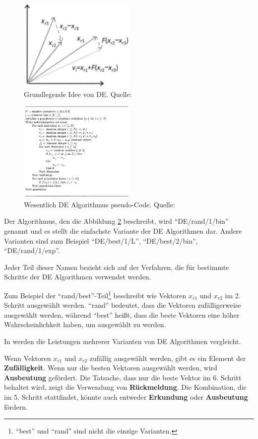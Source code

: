 \documentclass[twoside,twocolumn]{article}
\begin{document}
\begin{figure}
\caption{Grundlegende Idee von DE. Quelle: \cite{wiley_evolutionary}}
\label{fig:de_beispiel}
\centering
\includegraphics[width=0.5\textwidth]{images/de_beispiel.png}
\end{figure}

\begin{figure}
\caption{Wesentlich DE Algorithmus pseudo-Code. Quelle: \cite{wiley_evolutionary}}
\label{fig:de_pseudo}
\centering
\includegraphics[width=0.5\textwidth]{images/de_pseudo.png}
\end{figure}

Der Algorithmus, den die Abbildung \ref{fig:de_pseudo} beschreibt, wird \enquote{DE/rand/1/bin} genannt und es stellt die einfachste Variante der DE Algorithmen dar. Andere Varianten sind zum Beispiel \enquote{DE/best/1/L}, \enquote{DE/best/2/bin}, \enquote{DE/rand/1/exp}.\par
Jeder Teil dieser Namen bezieht sich auf der Verfahren, die für bestimmte Schritte der DE Algorithmen verwendet werden.\par
Zum Beispiel der \enquote{rand/best}-Teil\footnote{\enquote{best} und \enquote{rand} sind nicht die einzige Varianten.} beschreibt wie Vektoren $x_{r1}$ und $x_{r2}$ im 2. Schritt ausgewählt werden. \enquote{rand} bedeutet, dass die Vektoren zufälligerweise ausgewählt werden, während \enquote{best} heißt, dass die beste Vektoren eine höher Wahrscheinlichkeit haben, um ausgewählt zu werden.\par
In \cite{love_u_mex} werden die Leistungen mehrerer Varianten von DE Algorithmen vergleicht.\par
Wenn Vektoren $x_{r1}$ und $x_{r2}$ zufällig ausgewählt werden, gibt es ein Element der \textbf{Zufälligkeit}. Wenn nur die besten Vektoren ausgewählt werden, wird \textbf{Ausbeutung} gefördert. Die Tatsache, dass nur die beste Vektor im 6. Schritt behaltet wird, zeigt die Verwendung von \textbf{Rückmeldung}. Die Kombination, die im 5. Schritt stattfindet, könnte auch entweder \textbf{Erkundung} oder \textbf{Ausbeutung} fördern.
\end{document}

